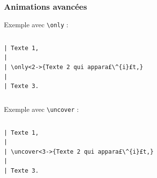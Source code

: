 \begin{frame}[fragile]
  \frametitle{Animations avancées}

Exemple avec \lstinline?\only? :
\begin{columns}
  \begin{column}{0.40\textwidth}
\begin{lstlisting}
| Texte 1,
| 
| \only<2->{Texte 2 qui appara£\^{i}£t,}
| 
| Texte 3.
\end{lstlisting}
  \end{column}
  \begin{column}{0.37\textwidth}
  \end{column}
\end{columns}

\bigskip
Exemple avec \lstinline?\uncover? :
\begin{columns}
  \begin{column}{0.40\textwidth}
\begin{lstlisting}
| Texte 1,
| 
| \uncover<3->{Texte 2 qui appara£\^{i}£t,}
| 
| Texte 3.
\end{lstlisting}
  \end{column}
  \begin{column}{0.37\textwidth}
  \end{column}
\end{columns}

\end{frame}



